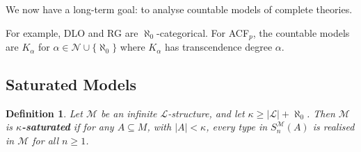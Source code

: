 \documentclass[]{article}
\theoremstyle{custhm}
\theoremstyle{cusdef}
\newtheorem{defin}[theorem]{Definition}
\theoremstyle{custhm}
\theoremstyle{custhm}
\theoremstyle{custhm}
\theoremstyle{ex}
\theoremstyle{custhm}
\theoremstyle{cusdef}
\theoremstyle{remark}
\theoremstyle{remark}
\theoremstyle{numremark}
\newcommand{\undf}[1]{\textit{\textbf{#1}}}
\renewcommand{\L}{\mathcal{L}}
\newcommand{\M}{\mathcal{M}}
\newcommand{\N}{\mathcal{N}}
\newcommand{\sman}{S_n^\M(A)}
\renewcommand{\subset}{\subseteq}
\begin{document}
We now have a long-term goal: to analyse countable models of complete theories.

For example, DLO and RG are $\aleph_0$-categorical. For ACF$_p$, the countable models are $K_\alpha$ for $\alpha \in \N\cup\{\aleph_0\}$ where $K_\alpha$ has transcendence degree $\alpha$.

\subsection*{Saturated Models}

\begin{defin}
Let $\M$ be an infinite $\L$-structure, and let $\kappa \ge |\L| + \aleph_0$. Then $\M$ is \undf{$\kappa$-saturated} if for any $A\subset M$, with $|A| < \kappa$, every type in $\sman$ is realised in $\M$ for all $n\ge 1$.
\end{defin}
\end{document}
